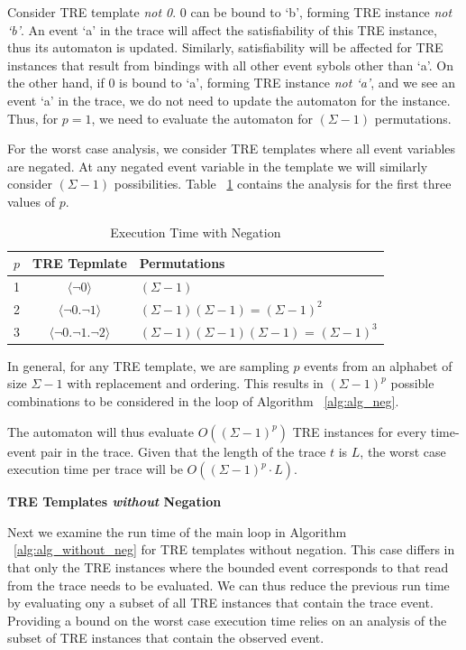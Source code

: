 \documentclass[]{sigplanconf}
\begin{document}
Consider TRE template \emph{not 0}.
0 can be bound to `b', forming TRE instance \emph{not `b'}. An event `a' in the trace will affect the satisfiability of this TRE instance, thus its automaton is updated. Similarly, satisfiability will be affected for TRE instances that result from bindings with all other event sybols other than `a'.
On the other hand, if 0 is bound to `a', forming TRE instance \emph{not `a'}, and we see an event `a' in the trace, we do not need to update the automaton for the instance. Thus, for $p=1$, we need to evaluate the automaton for $(\Sigma - 1)$ permutations.

For the worst case analysis, we consider TRE templates where all event variables are negated. At any negated event variable in the template we will similarly consider $(\Sigma - 1)$ possibilities. Table ~\ref{Exec-neg} contains the analysis for the first three values of $p$.

\begin{table}[ht]
  \centering
  \begin{tabular}{|c|c|l|}
    \hline
    \textbf{$p$} & \textbf{TRE Tepmlate} & \textbf{Permutations}\\
    \hline
      1 & $\langle \neg 0 \rangle$ & $(\Sigma - 1)$ \\
    \hline
      2 & $\langle \neg 0 . \neg 1 \rangle$ & $(\Sigma - 1)(\Sigma - 1) = (\Sigma - 1)^2$ \\
    \hline
      3 & $\langle \neg 0 . \neg 1 . \neg 2 \rangle$ & $(\Sigma - 1)(\Sigma - 1)(\Sigma - 1)$ = $(\Sigma - 1)^3$\\
    \hline
  \end{tabular}
\caption{Execution Time with Negation} \label{Exec-neg}
\end{table}

In general, for any TRE template, we are sampling $p$ events from an alphabet of size $\Sigma - 1$ with replacement and ordering. This results in $(\Sigma - 1)^p$ possible combinations to be considered in the loop of Algorithm ~\ref{alg:alg_neg}.

The automaton will thus evaluate $O((\Sigma - 1)^p)$ TRE instances for every time-event pair in the trace. Given that the length of the trace $t$ is $L$, the worst case execution time per trace will be $O((\Sigma - 1)^p \cdot L)$.

\vspace{3mm}

\noindent \textbf{TRE Templates \emph{without} Negation}

Next we examine the run time of the main loop in Algorithm ~\ref{alg:alg_without_neg} for TRE templates without negation. This case differs in that only the TRE instances where the bounded event corresponds to that read from the trace needs to be evaluated. We can thus reduce the previous run time by evaluating ony a subset of all TRE instances that contain the trace event. Providing a bound on the worst case execution time relies on an analysis of the subset of TRE instances that contain the observed event.
\end{document}
